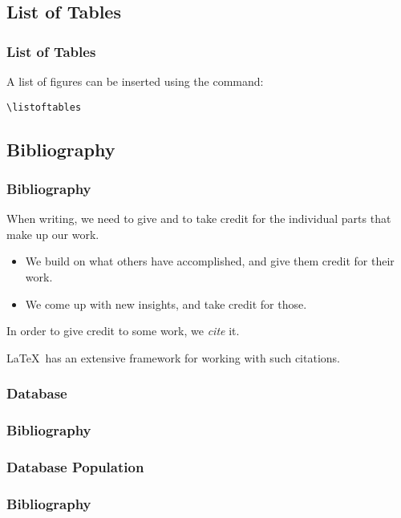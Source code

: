 {\subsection{List of Tables}
\begin{frame}[fragile]
  \frametitle{List of Tables}
  \vspace{7mm}
  A list of figures can be inserted using the command:
  \begin{verbatim}
\listoftables
  \end{verbatim}
\end{frame}

\subsection{Bibliography}
\begin{frame}[fragile]
  \frametitle{Bibliography}
  \vspace{3mm}
  When writing, we need to give and to take credit for the individual parts that make up our work.
  \begin{itemize}
    \item We build on what others have accomplished, and give them credit for their work.
    \item We come up with new insights, and take credit for those.
  \end{itemize}
  
  \pause
  \vspace{5mm}
  In order to give credit to some work, we \textsl{cite} it.
  
  \pause
  \vspace{5mm}
  \LaTeX\ has an extensive framework for working with such citations.
\end{frame}

\subsubsection{Database}
\begin{frame}[fragile]
  \frametitle{Bibliography }
  \vspace{3mm}
  
\end{frame}

\subsubsection{Database Population}
\begin{frame}[fragile]
  \frametitle{Bibliography }
  \vspace{3mm}
  

\end{frame}}

